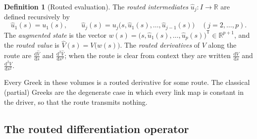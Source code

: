 \documentclass[11pt]{book}
\theoremstyle{plain}
\theoremstyle{definition}
\newtheorem{definition}[theorem]{Definition}
\theoremstyle{remark}
\newcommand{\dd}{\mathrm{d}}                                  %
\newcommand{\td}[2]{\frac{\dd #1}{\dd #2}}                    %
\begin{document}
\begin{definition}[Routed evaluation]\label{def:spine:evaluation}
The \emph{routed intermediates} $\hat u_j \colon I \to \mathbb{R}$ are defined
recursively by
\[
  \hat u_1(s) = u_1(s), \qquad
  \hat u_j(s) = u_j\bigl(s, \hat u_1(s), \ldots, \hat u_{j-1}(s)\bigr)
  \quad (j = 2, \ldots, p).
\]
The \emph{augmented state} is the vector
$w(s) = \bigl(s, \hat u_1(s), \ldots, \hat u_p(s)\bigr)^{\mathsf T}
\in \mathbb{R}^{p+1}$, and the \emph{routed value} is
$\hat V(s) = V\bigl(w(s)\bigr)$. The \emph{routed derivatives} of $V$ along
the route are $\td{\hat V}{s}$ and $\frac{\dd^2 \hat V}{\dd s^2}$; when the
route is clear from context they are written $\td{V}{s}$ and
$\frac{\dd^2 V}{\dd s^2}$.
\end{definition}

Every Greek in these volumes is a routed derivative for some route. The
classical (partial) Greeks are the degenerate case in which every link map is
constant in the driver, so that the route transmits nothing.

\subsection{The routed differentiation operator}\label{sec:spine:operator}
\end{document}
